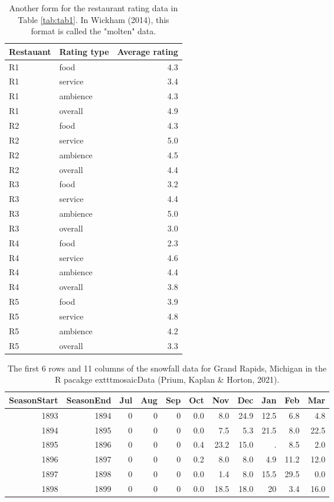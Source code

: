 \documentclass[10pt,a4paper,onecolumn]{article}
\begin{document}
\begin{table}

\caption{\label{tab:tab2}Another form for the restaurant rating data in Table \ref{tab:tab1}. In Wickham (2014), this format is called the "molten" data.}
\centering
\begin{tabular}[t]{llr}
\toprule
Restauant & Rating type & Average rating\\
\midrule
R1 & food & 4.3\\
R1 & service & 3.4\\
R1 & ambience & 4.3\\
R1 & overall & 4.9\\
R2 & food & 4.3\\
R2 & service & 5.0\\
R2 & ambience & 4.5\\
R2 & overall & 4.4\\
R3 & food & 3.2\\
R3 & service & 4.4\\
R3 & ambience & 5.0\\
R3 & overall & 3.0\\
R4 & food & 2.3\\
R4 & service & 4.6\\
R4 & ambience & 4.4\\
R4 & overall & 3.8\\
R5 & food & 3.9\\
R5 & service & 4.8\\
R5 & ambience & 4.2\\
R5 & overall & 3.3\\
\bottomrule
\end{tabular}
\end{table}

\begin{table}

\caption{\label{tab:tab3}The first 6 rows and 11 columns of the snowfall data for Grand Rapids, Michigan in the R pacakge   exttt{mosaicData} (Prium, Kaplan \& Horton, 2021).}
\centering
\begin{tabular}[t]{rrrrrrrrrrr}
\toprule
SeasonStart & SeasonEnd & Jul & Aug & Sep & Oct & Nov & Dec & Jan & Feb & Mar\\
\midrule
1893 & 1894 & 0 & 0 & 0 & 0.0 & 8.0 & 24.9 & 12.5 & 6.8 & 4.8\\
1894 & 1895 & 0 & 0 & 0 & 0.0 & 7.5 & 5.3 & 21.5 & 8.0 & 22.5\\
1895 & 1896 & 0 & 0 & 0 & 0.4 & 23.2 & 15.0 & . & 8.5 & 2.0\\
1896 & 1897 & 0 & 0 & 0 & 0.2 & 8.0 & 8.0 & 4.9 & 11.2 & 12.0\\
1897 & 1898 & 0 & 0 & 0 & 0.0 & 1.4 & 8.0 & 15.5 & 29.5 & 0.0\\
1898 & 1899 & 0 & 0 & 0 & 0.0 & 18.5 & 18.0 & 20 & 3.4 & 16.0\\
\bottomrule
\end{tabular}
\end{table}
\end{document}
